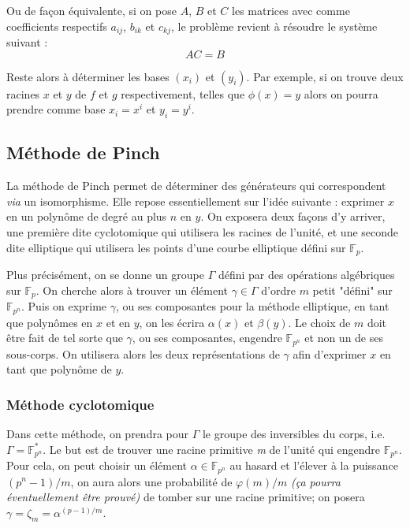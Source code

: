 \documentclass[a4paper]{article} %
\numberwithin{equation}{section}
\newcommand\nroot[1]{\textit{#1}\up{\textit{ième}}}
\begin{document}
Ou de façon équivalente, si on pose $A$, $B$ et $C$ les matrices avec comme coefficients respectifs $a_{ij}$, $b_{ik}$ et $c_{kj}$, le problème revient à résoudre le système suivant :
\[AC = B\]\par

Reste alors à déterminer les bases $(x_i)$ et $(y_i)$. Par exemple, si on trouve deux racines $x$ et $y$ de $f$ et $g$ respectivement, telles que $\phi(x) = y$ alors on pourra prendre comme base $x_i = x^i$ et $y_i = y^i$.



\subsection{Méthode de Pinch}

La méthode de Pinch permet de déterminer des générateurs qui correspondent \textit{via} un isomorphisme. Elle repose essentiellement sur l'idée suivante : exprimer $x$ en un polynôme de degré au plus $n$ en $y$. On exposera deux façons d'y arriver, une première dite cyclotomique qui utilisera les racines de l'unité, et une seconde dite elliptique qui utilisera les points d'une courbe elliptique défini sur $\mathbb{F}_p$.\\\par

Plus précisément, on se donne un groupe $\Gamma$ défini par des opérations algébriques sur $\mathbb{F}_p$. On cherche alors à trouver un élément $\gamma\in \Gamma$ d'ordre $m$ petit "défini" sur $\mathbb{F}_{p^n}$. Puis on exprime $\gamma$, ou ses composantes pour la méthode elliptique, en tant que polynômes en $x$ et en $y$, on les écrira $\alpha(x)$ et $\beta(y)$. Le choix de $m$ doit être fait de tel sorte que $\gamma$, ou ses composantes, engendre $\mathbb{F}_{p^n}$ et non un de ses sous-corps. On utilisera alors les deux représentations de $\gamma$ afin d'exprimer $x$ en tant que polynôme de $y$.

\subsubsection{Méthode cyclotomique}

Dans cette méthode, on prendra pour $\Gamma$ le groupe des inversibles du corps, i.e. $\Gamma = \mathbb{F}_{p^n}^*$. Le but est de trouver une racine primitive \nroot{m} de l'unité qui engendre $\mathbb{F}_{p^n}$. Pour cela, on peut choisir un élément $\alpha\in\mathbb{F}_{p^n}$ au hasard et l'élever à la puissance $(p^n - 1)/m$, on aura alors une probabilité de $\varphi(m)/m$ \textit{(ça pourra éventuellement être prouvé)} de tomber sur une racine primitive; on posera $\gamma = \zeta_m = \alpha^{(p-1)/m}$.\par
\end{document}
